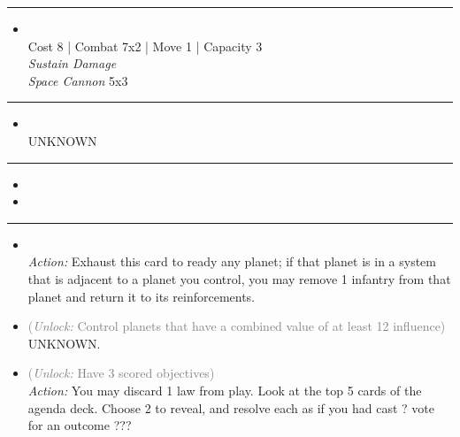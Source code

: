 \begin{multicols}{2}
\vspace{-10pt}\rule{\hsize}{0.4pt}\vspace{5pt}


\begin{itemize}
\item {}\\
Cost 8 | Combat 7x2 | Move 1 | Capacity 3 \\
\emph{Sustain Damage}\\
\emph{Space Cannon} 5x3
\end{itemize}

\vspace{-10pt}\rule{\hsize}{0.4pt}\vspace{5pt}


\begin{itemize}
\item {} %
\\
UNKNOWN
\end{itemize}

\vspace{-10pt}\rule{\hsize}{0.4pt}\vspace{5pt}

\nounits

\columnbreak
{}

\begin{itemize}
\item \instinct
\item \nullification
\end{itemize}

\vspace{-10pt}\rule{\hsize}{0.4pt}\vspace{5pt}


\begin{itemize}
\item {}\\
\emph{Action:}
Exhaust this card to ready any planet; if that planet is in a system that is adjacent to a planet you control, you may remove 1 infantry from that planet and return it to its reinforcements. 
\item {} \textcolor{gray}{(\emph{Unlock:} Control planets that have a combined value of at least 12 influence)}
UNKNOWN.
\item {} \textcolor{gray}{(\emph{Unlock:} Have 3 scored objectives)}\\
\emph{Action:} You may discard 1 law from play. Look at the top 5 cards of the agenda deck. Choose 2 to reveal, and resolve each as if you had cast ? vote for an outcome ???
\end{itemize}


\end{multicols}
